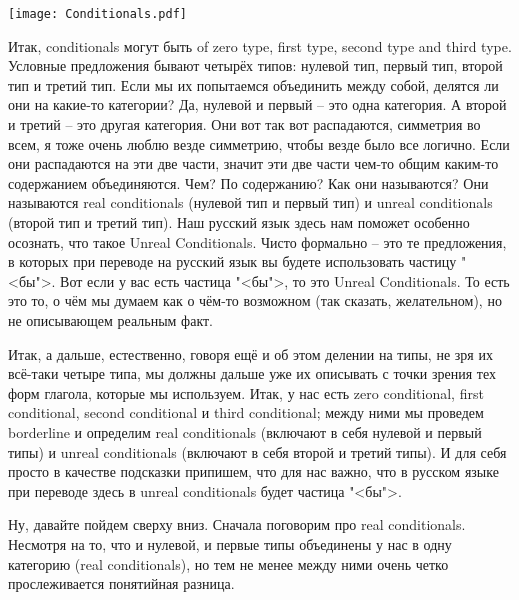 \documentclass[main.tex]{subfiles}
\begin{document}
{\parindent0pt\texttt{[image: Conditionals.pdf]}}

Итак, conditionals могут быть of zero type, first type, second type and third type.
Условные предложения бывают четырёх типов: нулевой тип, первый тип, второй тип и третий тип.
Если мы их попытаемся объединить между собой, делятся ли они на какие-то категории?
Да, нулевой и первый -- это одна категория.
А второй и третий -- это другая категория.
Они вот так вот распадаются, симметрия во всем, я тоже очень люблю везде симметрию, чтобы везде было все логично.
Если они распадаются на эти две части, значит эти две части чем-то общим каким-то содержанием объединяются.
Чем?
По содержанию?
Как они называются?
Они называются real conditionals (нулевой тип и первый тип) и unreal conditionals (второй тип и третий тип).
Наш русский язык здесь нам поможет особенно осознать, что такое Unreal Conditionals.
Чисто формально -- это те предложения, в которых при переводе на русский язык вы будете использовать частицу "<бы">.
Вот если у вас есть частица "<бы">, то это Unreal Conditionals.
То есть это то, о чём мы думаем как о чём-то возможном (так сказать, желательном), но не описывающем реальным факт.

Итак, а дальше, естественно, говоря ещё и об этом делении на типы, не зря их всё-таки четыре типа, мы должны дальше уже их описывать с точки зрения тех форм глагола, которые мы используем.
Итак, у нас есть zero conditional, first conditional, second conditional и third conditional; между ними мы проведем borderline и определим real conditionals (включают в себя нулевой и первый типы) и unreal conditionals (включают в себя второй и третий типы).
И для себя просто в качестве подсказки припишем, что для нас важно, что в русском языке при переводе здесь в unreal conditionals будет частица "<бы">.

Ну, давайте пойдем сверху вниз.
Сначала поговорим про real conditionals.
Несмотря на то, что и нулевой, и первые типы объединены у нас в одну категорию (real conditionals), но тем не менее между ними очень четко прослеживается понятийная разница.
\end{document}
